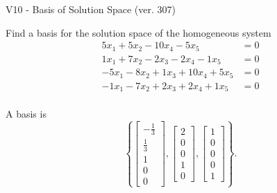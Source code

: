 \begin{exercise}
  \begin{exerciseTitle}V10 - Basis of Solution Space (ver. 307)\end{exerciseTitle}
  \begin{exerciseStatement}
    Find a basis for the solution space of the homogeneous system 
\begin{align*}
 5 x_ 1 + 5 x_ 2 -10 x_ 4 -5 x_ 5 &= 0  \\ 
  1 x_ 1 + 7 x_ 2 -2 x_ 3 -2 x_ 4 -1 x_ 5 &= 0  \\ 
  -5 x_ 1 -8 x_ 2 + 1 x_ 3 + 10 x_ 4 + 5 x_ 5 &= 0  \\ 
  -1 x_ 1 -7 x_ 2 + 2 x_ 3 + 2 x_ 4 + 1 x_ 5 &= 0  \\ 
 \end{align*}


 
  \end{exerciseStatement}

  \begin{exerciseAnswer}
   A basis is   
\[\left\{\left[\begin{array}{c}
-\frac{1}{3} \\
\frac{1}{3} \\
1 \\
0 \\
0
\end{array}\right] , \left[\begin{array}{c}
2 \\
0 \\
0 \\
1 \\
0
\end{array}\right] , \left[\begin{array}{c}
1 \\
0 \\
0 \\
0 \\
1
\end{array}\right]\right\}.\]

  


  \end{exerciseAnswer}
\end{exercise}